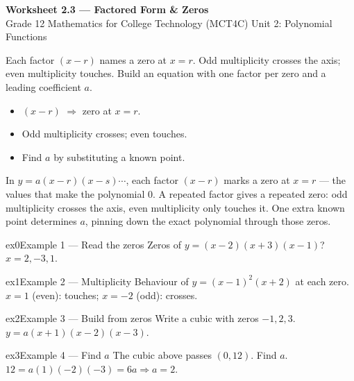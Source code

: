 \documentclass[11pt]{article}
\begin{document}
\begin{center}
{\LARGE\bfseries\color{titleblue}Worksheet 2.3 --- Factored Form \& Zeros}\\[2pt]
{\small Grade 12 Mathematics for College Technology (MCT4C) \textperiodcentered{} Unit 2: Polynomial Functions}
\end{center}

\begin{ideabox}
Each factor $(x-r)$ names a zero at $x=r$. Odd multiplicity crosses the axis; even multiplicity touches. Build an equation with one factor per zero and a leading coefficient $a$.
\begin{itemize}[leftmargin=*,itemsep=2pt]
  \item $(x-r)$ $\Rightarrow$ zero at $x=r$.
  \item Odd multiplicity crosses; even touches.
  \item Find $a$ by substituting a known point.
\end{itemize}
\end{ideabox}

\begin{learnbox}
In $y=a(x-r)(x-s)\cdots$, each factor $(x-r)$ marks a zero at $x=r$ — the values that make the polynomial $0$.
A repeated factor gives a repeated zero: odd multiplicity crosses the axis, even multiplicity only touches it.
One extra known point determines $a$, pinning down the exact polynomial through those zeros.
\end{learnbox}


\begin{example}{ex0}{Example 1 --- Read the zeros}
Zeros of $y=(x-2)(x+3)(x-1)$?\soln $x=2,-3,1$.
\end{example}

\begin{example}{ex1}{Example 2 --- Multiplicity}
Behaviour of $y=(x-1)^2(x+2)$ at each zero.\soln $x=1$ (even): touches; $x=-2$ (odd): crosses.
\end{example}

\begin{example}{ex2}{Example 3 --- Build from zeros}
Write a cubic with zeros $-1,2,3$.\soln $y=a(x+1)(x-2)(x-3)$.
\end{example}

\begin{example}{ex3}{Example 4 --- Find $a$}
The cubic above passes $(0,12)$. Find $a$.\soln $12=a(1)(-2)(-3)=6a\Rightarrow a=2$.
\end{example}
\end{document}
